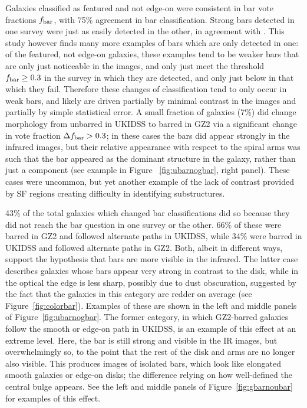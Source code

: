 Galaxies classified as featured and not edge-on were consistent in bar vote fractions $f_{\rm bar}$, with 75\% agreement in bar classification. Strong bars detected in one survey were just as easily detected in the other, in agreement with \citet{Whyte2002,Sheth2008,MenendezDelmestre2007}. This study however finds many more examples of bars which are only detected in one: of the featured, not edge-on galaxies, these examples tend to be weaker bars that are only just noticeable in the images, and only just meet the threshold $f_{\rm bar}\ge0.3$ in the survey in which they are detected, and only just below in that which they fail. Therefore these changes of classification tend to only occur in weak bars, and likely are driven partially by minimal contrast in the images and partially by simple statistical error. A small fraction of galaxies (7\%) did change morphology from unbarred in UKIDSS to barred in GZ2 via a significant change in vote fraction $\Delta f_{\rm bar} > 0.3$; in these cases the bars did appear strongly in the infrared images, but their relative appearance with respect to the spiral arms was such that the bar appeared as the dominant structure in the galaxy, rather than just a component (see example in Figure ~\ref{fig:ubarnogbar}, right panel). These cases were uncommon, but yet another example of the lack of contrast provided by SF regions creating difficulty in identifying substructures. 

43\% of the total galaxies which changed bar classifications did so because they did not reach the bar question in one survey or the other. 66\% of these were barred in GZ2 and followed alternate paths in UKIDSS, while 34\% were barred in UKIDSS and followed alternate paths in GZ2. Both, albeit in different ways, support the hypothesis that bars are more visible in the infrared. The latter case describes galaxies whose bars appear very strong in contrast to the disk, while in the optical the edge is less sharp, possibly due to dust obscuration, suggested by the fact that the galaxies in this category are redder on average (see Figure~\ref{fig:colorbar}).   Examples of these are shown in the left and middle panels of Figure~\ref{fig:ubarnogbar}. The former category, in which GZ2-barred galaxies follow the smooth or edge-on path in UKIDSS, is an example of this effect at an extreme level. Here, the bar is still strong and visible in the IR images, but overwhelmingly so, to the point that the rest of the disk and arms are no longer also visible. This produces images of isolated bars, which look like elongated smooth galaxies or edge-on disks; the difference relying on how well-defined the central bulge appears. See the left and middle panels of Figure~\ref{fig:gbarnoubar} for examples of this effect. 

